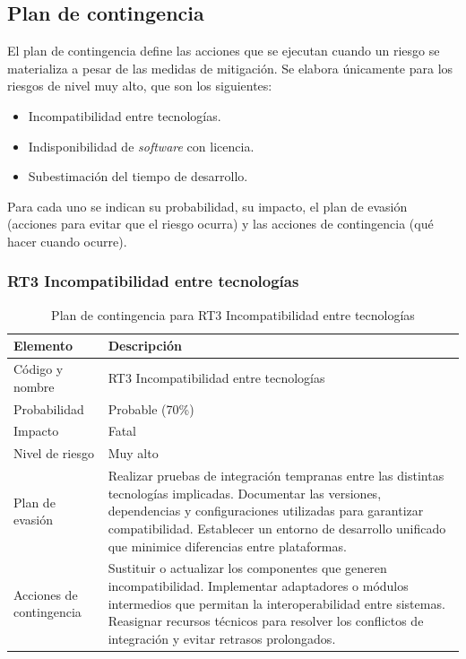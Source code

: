 \subsection{Plan de contingencia}

El plan de contingencia define las acciones que se ejecutan cuando un riesgo se materializa a pesar de las medidas de mitigación. Se elabora únicamente para los riesgos de nivel muy alto, que son los siguientes:
\begin{itemize}
	\item[RT3] Incompatibilidad entre tecnologías.
	\item[RT6] Indisponibilidad de \textit{software} con licencia.
	\item[RE1] Subestimación del tiempo de desarrollo. 
\end{itemize}

Para cada uno se indican su probabilidad, su impacto, el plan de evasión (acciones para evitar que el riesgo ocurra) y las acciones de contingencia (qué hacer cuando ocurre).

\subsubsection{RT3 Incompatibilidad entre tecnologías}

\begin{table}[H]
	\centering
	\renewcommand{\arraystretch}{1.2}
	\setlength{\tabcolsep}{4pt}
	\begin{tabular}{|p{}|p{}|}
		\hline
		\textbf{Elemento} & \textbf{Descripción} \\ \hline
		Código y nombre & RT3 Incompatibilidad entre tecnologías \\ \hline
		Probabilidad & Probable (70\%) \\ \hline
		Impacto & Fatal \\ \hline
		Nivel de riesgo & Muy alto \\ \hline
		Plan de evasión & 
		Realizar pruebas de integración tempranas entre las distintas tecnologías implicadas. 
		Documentar las versiones, dependencias y configuraciones utilizadas para garantizar compatibilidad.
		Establecer un entorno de desarrollo unificado que minimice diferencias entre plataformas. \\ \hline
		Acciones de contingencia & 
		Sustituir o actualizar los componentes que generen incompatibilidad. 
		Implementar adaptadores o módulos intermedios que permitan la interoperabilidad entre sistemas. 
		Reasignar recursos técnicos para resolver los conflictos de integración y evitar retrasos prolongados. \\ \hline
	\end{tabular}
	\caption{Plan de contingencia para RT3 Incompatibilidad entre tecnologías}
	\label{table:contingencia_incompatibilidad}
\end{table}

